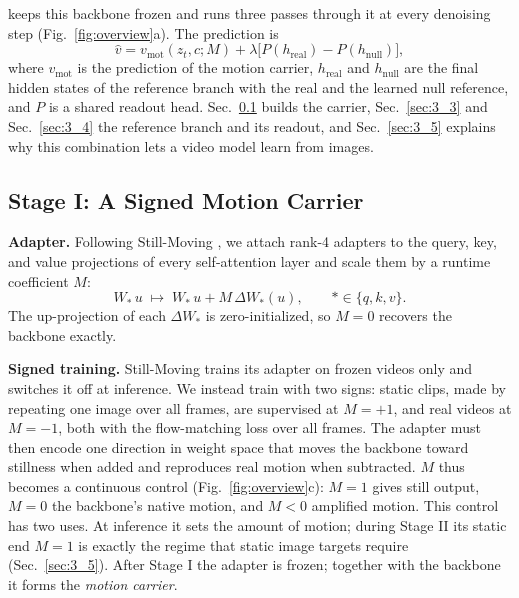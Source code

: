\method{} keeps this backbone frozen and runs three passes through it at every denoising step (Fig.~\ref{fig:overview}a). The prediction is
\begin{equation}\label{eq:1}
\hat v = v_{\mathrm{mot}}(z_t, c; M) + \lambda\big[P(h_{\mathrm{real}}) - P(h_{\mathrm{null}})\big],
\end{equation}
where $v_{\mathrm{mot}}$ is the prediction of the motion carrier, $h_{\mathrm{real}}$ and $h_{\mathrm{null}}$ are the final hidden states of the reference branch with the real and the learned null reference, and $P$ is a shared readout head. Sec.~\ref{sec:3_2} builds the carrier, Sec.~\ref{sec:3_3} and Sec.~\ref{sec:3_4} the reference branch and its readout, and Sec.~\ref{sec:3_5} explains why this combination lets a video model learn from images.

\subsection{Stage I: A Signed Motion Carrier}
\label{sec:3_2}

\textbf{Adapter.} Following Still-Moving \cite{chefer2024stillmoving}, we attach rank-4 adapters to the query, key, and value projections of every self-attention layer and scale them by a runtime coefficient $M$:
\begin{equation}\label{eq:2}
W_{\ast}\,u \;\mapsto\; W_{\ast}\,u + M\,\Delta W_{\ast}(u), \qquad \ast \in \{q, k, v\}.
\end{equation}
The up-projection of each $\Delta W_\ast$ is zero-initialized, so $M{=}0$ recovers the backbone exactly.

\textbf{Signed training.} Still-Moving trains its adapter on frozen videos only and switches it off at inference. We instead train with two signs: static clips, made by repeating one image over all frames, are supervised at $M{=}{+}1$, and real videos at $M{=}{-}1$, both with the flow-matching loss over all frames. The adapter must then encode one direction in weight space that moves the backbone toward stillness when added and reproduces real motion when subtracted. $M$ thus becomes a continuous control (Fig.~\ref{fig:overview}c): $M{=}1$ gives still output, $M{=}0$ the backbone's native motion, and $M{<}0$ amplified motion. This control has two uses. At inference it sets the amount of motion; during Stage II its static end $M{=}1$ is exactly the regime that static image targets require (Sec.~\ref{sec:3_5}). After Stage I the adapter is frozen; together with the backbone it forms the \emph{motion carrier}.

